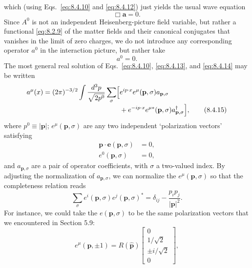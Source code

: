 which (using Eqs.~\eqref{eq:8.4.10} and \eqref{eq:8.4.12}) just yields the usual wave equation
\begin{equation}
\Box\mathbf a=0.
\tag{8.4.13}\label{eq:8.4.13}
\end{equation}
Since $A^0$ is not an independent Heisenberg-picture field variable, but rather
a functional \eqref{eq:8.2.9} of the matter fields and their canonical conjugates that
vanishes in the limit of zero charges, we do not introduce any corresponding
operator $a^0$ in the interaction picture, but rather take
\begin{equation}
a^0=0.
\tag{8.4.14}\label{eq:8.4.14}
\end{equation}
The most general real solution of Eqs.~\eqref{eq:8.4.10}, \eqref{eq:8.4.13}, and \eqref{eq:8.4.14} may
be written
\begin{align}
a^\mu(x)=(2\pi)^{-3/2}\int\frac{d^3p}{\sqrt{2p^0}}\sum_\sigma
\Bigl[&e^{ip\cdot x}e^\mu(\mathbf p,\sigma)a_{\mathbf p,\sigma}
\notag\\[-2pt]
&+e^{-ip\cdot x}e^{\mu *}(\mathbf p,\sigma)
  a^\dagger_{\mathbf p,\sigma}\Bigr],
\tag{8.4.15}\label{eq:8.4.15}
\end{align}
where $p^0\equiv\lvert\mathbf p\rvert$; $e^\mu(\mathbf p,\sigma)$ are any two
independent `polarization vectors' satisfying
\begin{align}
\mathbf p\cdot\mathbf e(\mathbf p,\sigma)&=0,
\tag{8.4.16}\label{eq:8.4.16}\\
e^0(\mathbf p,\sigma)&=0,
\tag{8.4.17}\label{eq:8.4.17}
\end{align}
and $a_{\mathbf p,\sigma}$ are a pair of operator coefficients, with $\sigma$ a
two-valued index. By adjusting the normalization of $a_{\mathbf p,\sigma}$, we
can normalize the $e^\mu(\mathbf p,\sigma)$ so that the completeness relation
reads
\begin{equation}
\sum_\sigma e^i(\mathbf p,\sigma)e^j(\mathbf p,\sigma)^*
=\delta_{ij}-\frac{p_i p_j}{\lvert\mathbf p\rvert^2}.
\tag{8.4.18}\label{eq:8.4.18}
\end{equation}
For instance, we could take the $e(\mathbf p,\sigma)$ to be the same
polarization vectors that we encountered in Section 5.9:
\begin{equation}
e^\mu(\mathbf p,\mathord\pm1)=R(\widehat{\mathbf p})
\begin{bmatrix}
0\\[1pt]1/\sqrt2\\[1pt]\mathord\pm i/\sqrt2\\[1pt]0
\end{bmatrix},
\tag{8.4.19}\label{eq:8.4.19}
\end{equation}
